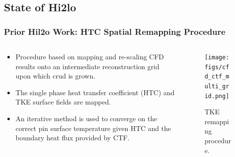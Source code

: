 \documentclass[t, pdftex]{beamer}
\begin{document}
\subsection*{State of Hi2lo}
\begin{frame}[shrink=10]
\frametitle{Prior Hil2o Work: HTC Spatial Remapping Procedure}
\begin{columns}
    \begin{column}{0.5\textwidth}
        \begin{itemize}
            \item Procedure based on mapping and re-scaling CFD results onto an intermediate reconstruction grid upon which crud is grown.
            \item The single phase heat transfer coefficient (HTC) and TKE surface fields are mapped.
            \item An iterative method is used to converge on the correct pin surface temperature given HTC and the boundary heat flux provided by CTF.
        \end{itemize}
    \end{column}
    \begin{column}{0.5\textwidth}  %
        \begin{center}
            \begin{figure}
                \texttt{[image: figs/cfd\_ctf\_multi\_grid.png]}
                \caption{\centering TKE remapping procedure. \cite{salko17}}      
            \end{figure}
        \end{center}
    \end{column}
\end{columns}
\vspace{-12pt}
\end{frame}

\end{document}
